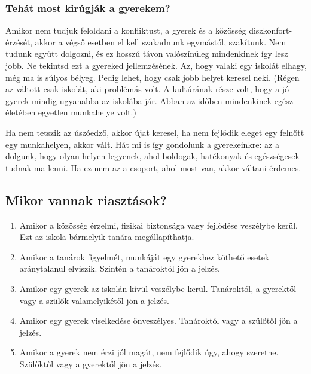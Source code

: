 \hypertarget{tehat-most-kirugjak-a-gyerekem}{%
\subsubsection{Tehát most kirúgják a
gyerekem?}\label{tehat-most-kirugjak-a-gyerekem}}

Amikor nem tudjuk feloldani a konfliktust, a gyerek és a közösség
disz\-kon\-fort-érzését, akkor a végső esetben el kell szakadnunk
egymástól, szakítunk. Nem tudunk együtt dolgozni, és ez hosszú távon
valószínűleg mindenkinek így lesz jobb. Ne tekintsd ezt a gyereked
jellemzésének. Az, hogy valaki egy iskolát elhagy, még ma is súlyos
bélyeg. Pedig lehet, hogy csak jobb helyet keresel neki.
(Régen az váltott csak iskolát, aki problémás volt. A kultúrának része
volt,
hogy a jó gyerek mindig ugyanabba az iskolába jár. Abban az időben
mindenkinek egész életében egyetlen munkahelye volt.)

Ha nem tetszik az úszóedző, akkor újat keresel, ha nem fejlődik eleget
egy felnőtt egy munkahelyen, akkor vált. Hát mi is így gondolunk a
gyerekeinkre: az a dolgunk, hogy olyan helyen legyenek, ahol boldogak,
hatékonyak és egészségesek tudnak ma lenni. Ha ez nem az a csoport, ahol
most van, akkor váltani érdemes.

\hypertarget{mikor-vannak-riasztasok}{%
\subsection{Mikor vannak riasztások?}\label{mikor-vannak-riasztasok}}

\begin{enumerate}
\def\labelenumi{\arabic{enumi}.}
\tightlist
\item
  Amikor a közösség érzelmi, fizikai biztonsága vagy fejlődése veszélybe
  kerül. Ezt az iskola bármelyik tanára megállapíthatja.
\item
  Amikor a tanárok figyelmét, munkáját egy gyerekhez köthető
  esetek aránytalanul elviszik. Szintén a tanároktól jön a jelzés.
\item
  Amikor egy gyerek az iskolán kívül veszélybe kerül. Tanároktól, a gyerektől vagy a
  szülők valamelyikétől jön a jelzés.
\item
  Amikor egy gyerek viselkedése önveszélyes. Tanároktól vagy a szülőtől jön a
  jelzés.
\item
  Amikor a gyerek nem érzi jól magát, nem fejlődik úgy, ahogy szeretne. Szülőktől
  vagy a gyerektől jön a jelzés.
\end{enumerate}

